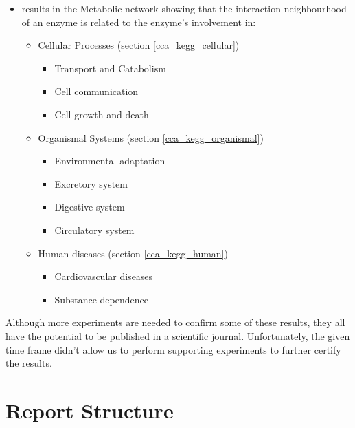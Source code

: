 \begin{itemize}
 \item results in the Metabolic network showing that the interaction neighbourhood of an enzyme is related to the enzyme's involvement in:
 \begin{itemize}
  \item Cellular Processes (section \ref{cca_kegg_cellular})
  \begin{itemize}
    \item Transport and Catabolism
    \item Cell communication
    \item Cell growth and death
  \end{itemize}
  
  \item Organismal Systems (section \ref{cca_kegg_organismal})
  \begin{itemize}
    \item Environmental adaptation
    \item Excretory system
    \item Digestive system
    \item Circulatory system
  \end{itemize}
  
  \item Human diseases (section \ref{cca_kegg_human})
  \begin{itemize}
    \item Cardiovascular diseases
    \item Substance dependence
  \end{itemize}
  
 \end{itemize}
 
\end{itemize}

Although more experiments are needed to confirm some of these results, they all have the potential to be published in a scientific journal. Unfortunately, the given time frame didn't allow us to perform supporting experiments to further certify the results.

\section{Report Structure}

